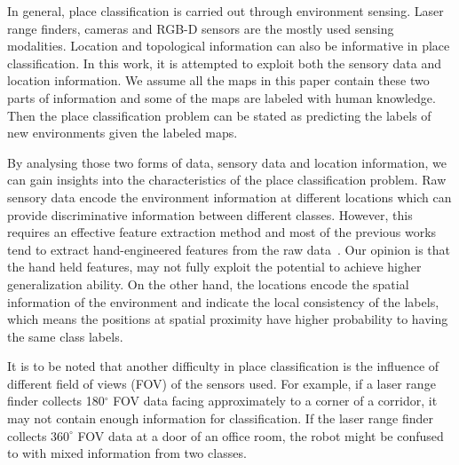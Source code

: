 \documentclass[letterpaper, 10 pt, conference]{ieeeconf}  %
\begin{document}
In general, place classification is carried out through environment sensing. Laser range finders, cameras and RGB-D sensors are the mostly used sensing modalities. Location and topological information can also be informative in place classification. In this work, it is attempted to exploit both the sensory data and location information. We assume all the maps in this paper contain these two parts of information and some of the maps are labeled with human knowledge. Then the place classification problem can be stated as predicting the labels of new environments given the labeled maps.


By analysing those two forms of data, sensory data and location information,  we can gain insights into the characteristics of the place classification problem. Raw sensory data encode the environment information at different locations which can provide discriminative information between different classes. However, this requires an effective feature extraction method and most of the previous works tend to extract hand-engineered features from the raw data~\cite{mozos2005supervised,sousa2007real}. Our opinion is that the hand held features, may not fully exploit the potential to achieve higher generalization ability. On the other hand, the locations encode the spatial information of the environment and indicate the local consistency of the labels, which means the positions at spatial proximity have higher probability to having the same class labels.

It is to be noted that another difficulty in place classification is the influence of different field of views (FOV) of the sensors used. For example, if a laser range finder collects 180$^\circ$ FOV data facing approximately to a corner of a corridor, it may not contain enough information for classification. If the laser range finder collects $360^\circ$ FOV data at a door of an office room, the robot might  be confused to with mixed information from two classes.
\end{document}
